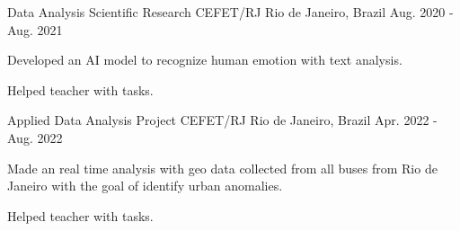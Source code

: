 

\begin{cventries}

  \cventry
    {Data Analysis Scientific Research} %
    {CEFET/RJ} %
    {Rio de Janeiro, Brazil} %
    {Aug. 2020 - Aug. 2021} %
    {
      \begin{cvitems} %
        \item {Developed an AI model to recognize human emotion with text analysis.}
        \item {Helped teacher with tasks.}
      \end{cvitems}
    }

  \cventry
    {Applied Data Analysis Project} %
    {CEFET/RJ} %
    {Rio de Janeiro, Brazil} %
    {Apr. 2022 - Aug. 2022} %
    {
      \begin{cvitems} %
        \item {Made an real time analysis with geo data collected from all buses from Rio de Janeiro with the goal of identify urban anomalies.}
        \item {Helped teacher with tasks.}
      \end{cvitems}
    }

\end{cventries}
